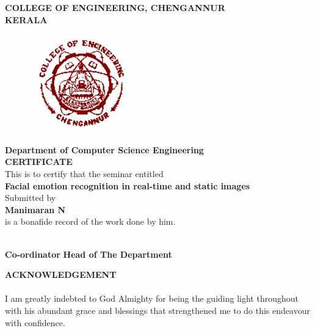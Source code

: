 \documentclass[a4paper,12pt,oneside]{article}
\begin{document}
\newpage
\thispagestyle{empty}
\begin{center}
\setlength{\baselineskip}{1.5\baselineskip}
{\large\textbf{COLLEGE OF ENGINEERING, CHENGANNUR}}
\\
{\large\textbf{KERALA}}
\\
\begin{figure}[H]
\centering
\includegraphics{ceclogo.png}
\end{figure}
\setlength{\baselineskip}{1.5\baselineskip}
\textbf{Department of Computer Science Engineering}
\\
\textbf{CERTIFICATE}
\\
This is to certify that the seminar entitled
\\
\textbf{Facial emotion recognition in real-time and static
images}
\\
Submitted by
\\
\textbf{Manimaran N}
\\
is a bonafide record of the work done by him.
\end{center}
\vspace{8mm}
\vspace{14ex}
\hspace{55ex}
\\
\vspace{2ex}
\hspace{0ex}
\textbf{
Co-ordinator}
\hspace{45ex}
\textbf{
Head of The Department}
\newpage
{}


\renewcommand{\headrulewidth}{0.0pt}
\renewcommand{\footrulewidth}{0.0pt}



\begin{center}
\large{\textbf{ACKNOWLEDGEMENT}}
\end{center}
\vspace{6ex}
\setlength{\baselineskip}{1.5\baselineskip}

\paragraph{}
I am greatly indebted to God Almighty for being the guiding light throughout with his
abundant grace and blessings that strengthened me to do this endeavour with confidence.
\end{document}
